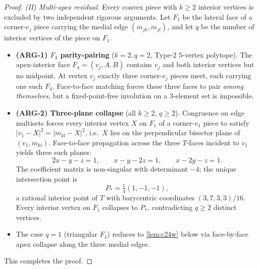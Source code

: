 \documentclass[11pt,a4paper]{article}
\theoremstyle{plain}
\theoremstyle{definition}
\theoremstyle{remark}
\begin{document}
\begin{proof}
\emph{(II) Multi-apex residual.}
Every convex piece with $k \geq 2$ interior vertices is excluded by two
independent rigorous arguments.  Let $F_{1}$ be the lateral face of a
corner-$v_{j}$ piece carrying the medial edge $(m_{jk}, m_{jl})$, and let
$q$ be the number of interior vertices of the piece on $F_{1}$.
\begin{itemize}
  \item \textbf{(ARG-1) $F_{4}$ parity-pairing} ($k = 2, q = 2$, Type-$2$
        $5$-vertex polytope).  The apex-interior face
        $F_{4} = (v_{j}, A, B)$ contains $v_{j}$ and both interior vertices
        but no midpoint.  At vertex $v_{j}$ exactly three corner-$v_{j}$
        pieces meet, each carrying one such $F_{4}$.  Face-to-face matching
        forces these three faces to pair \emph{among themselves}, but a
        fixed-point-free involution on a $3$-element set is impossible.
  \item \textbf{(ARG-2) Three-plane collapse} (all $k \geq 2$, $q \geq 2$).
        Congruence on edge multisets forces every interior vertex $X$ on
        $F_{1}$ of a corner-$v_{1}$ piece to satisfy
        $|v_{1} - X|^{2} = |m_{kl} - X|^{2}$, i.e.\ $X$ lies on the
        perpendicular bisector plane of $(v_{1}, m_{kl})$.  Face-to-face
        propagation across the three $T$-faces incident to $v_{1}$ yields
        three such planes:
        \[
          2x - y - z = 1, \qquad x - y - 2z = 1, \qquad x - 2y - z = 1.
        \]
        The coefficient matrix is non-singular with determinant $-4$; the
        unique intersection point is
        \[
          P_{*} = \tfrac{1}{4}(1, -1, -1),
        \]
        a rational interior point of $T$ with barycentric coordinates
        $(3, 7, 3, 3)/16$.  Every interior vertex on $F_{1}$ collapses to
        $P_{*}$, contradicting $q \geq 2$ distinct vertices.
  \item The case $q = 1$ (triangular $F_{1}$) reduces to \cref{lem:c24w}
        below via face-by-face apex collapse along the three medial edges.
\end{itemize}
This completes the proof.
\end{proof}
\end{document}
